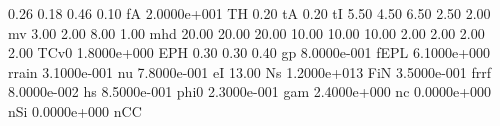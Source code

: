 0.26 0.18 0.46 0.10 fA
2.0000e+001    TH
0.20           tA
0.20           tI
5.50 4.50 6.50 2.50 2.00 mv
3.00 2.00 8.00 1.00 mhd
20.00 20.00 20.00 10.00 10.00 10.00 2.00 2.00 2.00 2.00 TCv0
1.8000e+000   EPH
0.30 0.30 0.40 gp
8.0000e-001  fEPL
6.1000e+000 rrain
3.1000e-001    nu
7.8000e-001    eI
13.00          Ns
1.2000e+013   FiN
3.5000e-001  frrf
8.0000e-002    hs
8.5000e-001  phi0
2.3000e-001   gam
2.4000e+000    nc
0.0000e+000   nSi
0.0000e+000   nCC
